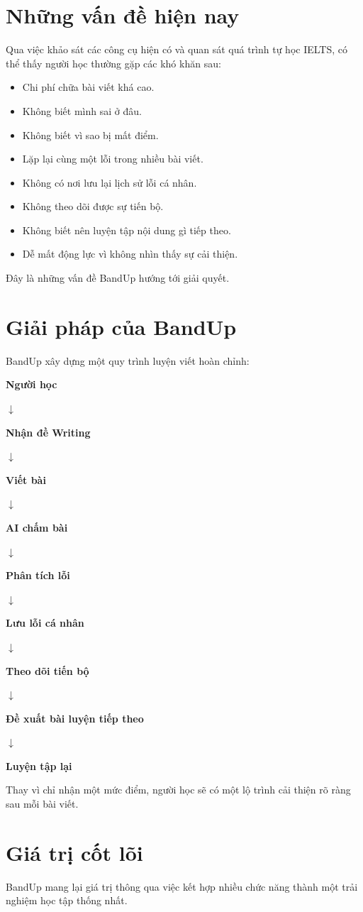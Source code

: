 \documentclass[12pt,a4paper]{article}
\newcommand{\flowarrow}{\par\centering\sffamily\color{BandBlue}\Large$\downarrow$\par}
\newcommand{\flowstep}[1]{\par\centering\sffamily\bfseries #1\par}
\begin{document}
\section{Những vấn đề hiện nay}

Qua việc khảo sát các công cụ hiện có và quan sát quá trình tự học IELTS, có thể thấy người học thường gặp các khó khăn sau:

\begin{itemize}
  \item Chi phí chữa bài viết khá cao.
  \item Không biết mình sai ở đâu.
  \item Không biết vì sao bị mất điểm.
  \item Lặp lại cùng một lỗi trong nhiều bài viết.
  \item Không có nơi lưu lại lịch sử lỗi cá nhân.
  \item Không theo dõi được sự tiến bộ.
  \item Không biết nên luyện tập nội dung gì tiếp theo.
  \item Dễ mất động lực vì không nhìn thấy sự cải thiện.
\end{itemize}

Đây là những vấn đề BandUp hướng tới giải quyết.

\section{Giải pháp của BandUp}

BandUp xây dựng một quy trình luyện viết hoàn chỉnh:

\begin{summarybox}
\flowstep{Người học}
\flowarrow
\flowstep{Nhận đề Writing}
\flowarrow
\flowstep{Viết bài}
\flowarrow
\flowstep{AI chấm bài}
\flowarrow
\flowstep{Phân tích lỗi}
\flowarrow
\flowstep{Lưu lỗi cá nhân}
\flowarrow
\flowstep{Theo dõi tiến bộ}
\flowarrow
\flowstep{Đề xuất bài luyện tiếp theo}
\flowarrow
\flowstep{Luyện tập lại}
\end{summarybox}

Thay vì chỉ nhận một mức điểm, người học sẽ có một lộ trình cải thiện rõ ràng sau mỗi bài viết.

\section{Giá trị cốt lõi}

BandUp mang lại giá trị thông qua việc kết hợp nhiều chức năng thành một trải nghiệm học tập thống nhất.
\end{document}
